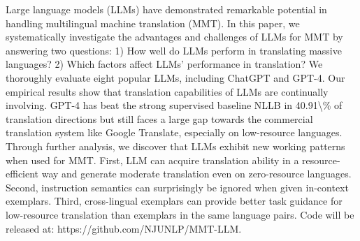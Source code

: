 Large language models (LLMs) have demonstrated remarkable potential in handling multilingual machine translation (MMT). In this paper, we systematically investigate the advantages and challenges of LLMs for MMT by answering two questions: 1) How well do LLMs perform in translating massive languages? 2) Which factors affect LLMs' performance in translation? We thoroughly evaluate eight popular LLMs, including ChatGPT and GPT-4. Our empirical results show that translation capabilities of LLMs are continually involving. GPT-4 has beat the strong supervised baseline NLLB in 40.91\textbackslash{}\% of translation directions but still faces a large gap towards the commercial translation system like Google Translate, especially on low-resource languages. Through further analysis, we discover that LLMs exhibit new working patterns when used for MMT. First, LLM can acquire translation ability in a resource-efficient way and generate moderate translation even on zero-resource languages. Second, instruction semantics can surprisingly be ignored when given in-context exemplars. Third, cross-lingual exemplars can provide better task guidance for low-resource translation than exemplars in the same language pairs. Code will be released at: https://github.com/NJUNLP/MMT-LLM.